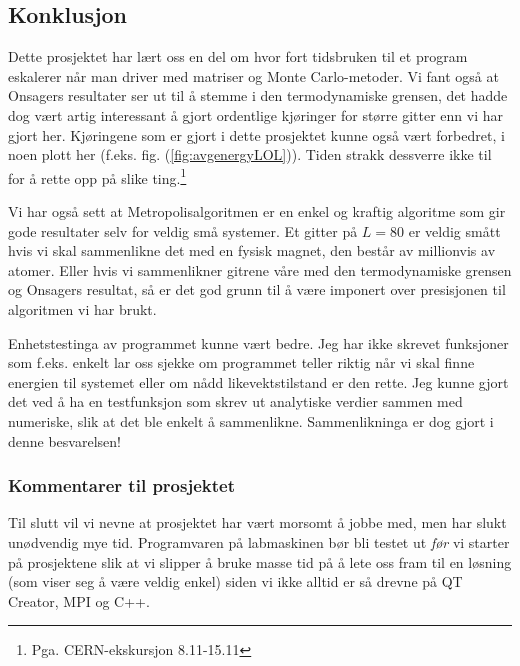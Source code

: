 \documentclass[norsk, 10pt]{article}
\begin{document}
\subsection*{Konklusjon}
Dette prosjektet har lært oss en del om hvor fort tidsbruken til et program eskalerer når man driver med matriser og Monte Carlo-metoder. Vi fant også at Onsagers resultater ser ut til å stemme i den termodynamiske grensen, det hadde dog vært artig interessant å gjort ordentlige kjøringer for større gitter enn vi har gjort her. Kjøringene som er gjort i dette prosjektet kunne også vært forbedret, i noen plott her (f.eks. fig. (\ref{fig:avgenergyLOL})). Tiden strakk dessverre ikke til for å rette opp på slike ting.\footnote{Pga. CERN-ekskursjon 8.11-15.11}

Vi har også sett at Metropolisalgoritmen er en enkel og kraftig algoritme som gir gode resultater selv for veldig små systemer. Et gitter på $L=80$ er veldig smått hvis vi skal sammenlikne det med en fysisk magnet, den består av millionvis av atomer. Eller hvis vi sammenlikner gitrene våre med den termodynamiske grensen og Onsagers resultat, så er det god grunn til å være imponert over presisjonen til algoritmen vi har brukt.

Enhetstestinga av programmet kunne vært bedre. Jeg har ikke skrevet funksjoner som f.eks. enkelt lar oss sjekke om programmet teller riktig når vi skal finne energien til systemet eller om nådd likevektstilstand er den rette. Jeg kunne gjort det ved å ha en testfunksjon som skrev ut analytiske verdier sammen med numeriske, slik at det ble enkelt å sammenlikne. Sammenlikninga er dog gjort i denne besvarelsen!

\subsubsection*{Kommentarer til prosjektet}
Til slutt vil vi nevne at prosjektet har vært morsomt å jobbe med, men har slukt unødvendig mye tid. Programvaren på labmaskinen bør bli testet ut \emph{før} vi starter på prosjektene slik at vi slipper å bruke masse tid på å lete oss fram til en løsning (som viser seg å være veldig enkel) siden vi ikke alltid er så drevne på QT Creator, MPI og C++.
\end{document}
